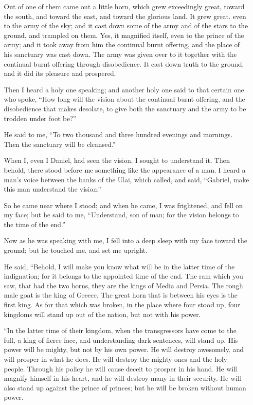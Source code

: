  Out of one of them came out a little horn, which grew
exceedingly great, toward the south, and toward the east, and toward the
glorious land.  It grew great, even to the army of the
sky; and it cast down some of the army and of the stars to the ground,
and trampled on them.  Yes, it magnified itself, even to
the prince of the army; and it took away from him the continual burnt
offering, and the place of his sanctuary was cast down. 
The army was given over to it together with the continual burnt offering
through disobedience. It cast down truth to the ground, and it did its
pleasure and prospered.

 Then I heard a holy one speaking; and another holy one
said to that certain one who spoke, ``How long will the vision about the
continual burnt offering, and the disobedience that makes desolate, to
give both the sanctuary and the army to be trodden under foot be?''

 He said to me, ``To two thousand and three hundred
evenings and mornings. Then the sanctuary will be cleansed.''

 When I, even I Daniel, had seen the vision, I sought to
understand it. Then behold, there stood before me something like the
appearance of a man.  I heard a man's voice between the
banks of the Ulai, which called, and said, ``Gabriel, make this man
understand the vision.''

 So he came near where I stood; and when he came, I was
frightened, and fell on my face; but he said to me, ``Understand, son of
man; for the vision belongs to the time of the end.''

 Now as he was speaking with me, I fell into a deep sleep
with my face toward the ground; but he touched me, and set me upright.

 He said, ``Behold, I will make you know what will be in
the latter time of the indignation; for it belongs to the appointed time
of the end.  The ram which you saw, that had the two
horns, they are the kings of Media and Persia.  The rough
male goat is the king of Greece. The great horn that is between his eyes
is the first king.  As for that which was broken, in the
place where four stood up, four kingdoms will stand up out of the
nation, but not with his power.

 ``In the latter time of their kingdom, when the
transgressors have come to the full, a king of fierce face, and
understanding dark sentences, will stand up.  His power
will be mighty, but not by his own power. He will destroy awesomely, and
will prosper in what he does. He will destroy the mighty ones and the
holy people.  Through his policy he will cause deceit to
prosper in his hand. He will magnify himself in his heart, and he will
destroy many in their security. He will also stand up against the prince
of princes; but he will be broken without human power.

